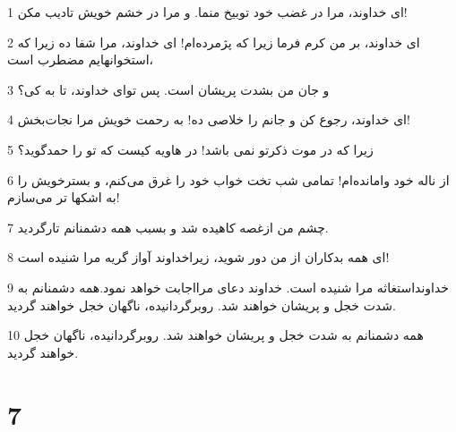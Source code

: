 \par 1 ای خداوند، مرا در غضب خود توبیخ منما. و مرا در خشم خویش تادیب مکن!
\par 2 ‌ای خداوند، بر من کرم فرما زیرا که پژمرده‌ام! ای خداوند، مرا شفا ده زیرا که استخوانهایم مضطرب است،
\par 3 و جان من بشدت پریشان است. پس تو‌ای خداوند، تا به کی؟
\par 4 ‌ای خداوند، رجوع کن و جانم را خلاصی ده! به رحمت خویش مرا نجات‌بخش!
\par 5 زیرا که در موت ذکرتو نمی باشد! در هاویه کیست که تو را حمدگوید؟
\par 6 از ناله خود وامانده‌ام! تمامی شب تخت خواب خود را غرق می‌کنم، و بسترخویش را به اشکها تر می‌سازم!
\par 7 چشم من ازغصه کاهیده شد و بسبب همه دشمنانم تارگردید.
\par 8 ‌ای همه بدکاران از من دور شوید، زیراخداوند آواز گریه مرا شنیده است!
\par 9 خداونداستغاثه مرا شنیده است. خداوند دعای مرااجابت خواهد نمود.همه دشمنانم به شدت خجل و پریشان خواهند شد. روبرگردانیده، ناگهان خجل خواهند گردید.
\par 10 همه دشمنانم به شدت خجل و پریشان خواهند شد. روبرگردانیده، ناگهان خجل خواهند گردید.
 
\chapter{7}

